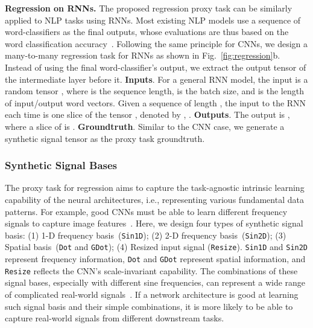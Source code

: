 \documentclass{article}
\begin{document}
\vspace{-2pt}
\textbf{Regression on RNNs.}
The proposed regression proxy task can be similarly applied to NLP tasks using RNNs.
Most existing NLP models use a sequence of word-classifiers as the final outputs, whose evaluations are thus based on the word classification accuracy~\cite{hochreiter1997long,mikolov2010recurrent,vaswani2017attention}.
Following the same principle for CNNs, we design a many-to-many regression task for RNNs as shown in Fig.~\ref{fig:regression}b.
Instead of using the final word-classifier's output, we extract the output tensor of the intermediate layer before it.
\textbf{Inputs}. For a general RNN model, the input is a random tensor , where  is the sequence length,  is the batch size, and  is the length of input/output word vectors.
Given a sequence of length , the input to the RNN each time is one slice of the tensor , denoted by , . 
\textbf{Outputs}. The output is , where a slice of  is .
\textbf{Groundtruth}. Similar to the CNN case, we generate a synthetic signal tensor  as the proxy task groundtruth. 


\vspace{-6pt}
\subsubsection{Synthetic Signal Bases}
\label{sec:signals}
\vspace{-4pt}

The proxy task for regression aims to capture the task-agnostic intrinsic learning capability of the neural architectures, i.e., representing various fundamental data patterns.
For example, good CNNs must be able to learn different frequency signals to capture image features~\cite{xu2019frequency}.
Here, we design four types of synthetic signal basis: (1) 1-D frequency basis~(\texttt{Sin1D}); (2) 2-D frequency basis~(\texttt{Sin2D}); (3) Spatial basis~(\texttt{Dot} and \texttt{GDot}); (4) Resized input signal (\texttt{Resize}).
\texttt{Sin1D} and \texttt{Sin2D} represent frequency information, \texttt{Dot} and \texttt{GDot} represent spatial information, and \texttt{Resize} reflects the CNN's scale-invariant capability. The combinations of these signal bases, especially with different sine frequencies, can represent a wide range of complicated real-world signals~\cite{tolstov2012fourier}.
If a network architecture is good at learning such signal basis and their simple combinations, it is more likely to be able to capture real-world signals from different downstream tasks.
\end{document}
